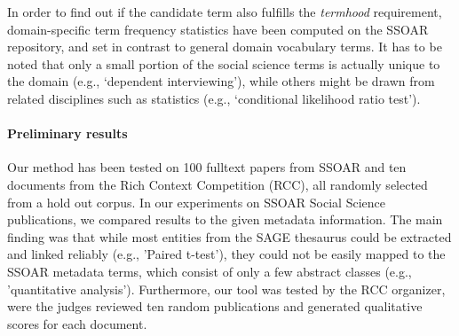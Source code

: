 In order to find out if the candidate term also fulfills the \textit{termhood} requirement, domain-specific term frequency statistics have been computed on the SSOAR repository, and set in contrast to general domain vocabulary terms. 
It has to be noted that only a small portion of the social science terms is actually unique to the domain (e.g., `dependent interviewing'), while others might be drawn from related disciplines such as statistics (e.g., `conditional likelihood ratio test').


\paragraph{Preliminary results}%
Our method has been tested on 100 fulltext papers from SSOAR and ten documents from the Rich Context Competition (RCC), all randomly selected from a hold out corpus.
In our experiments on SSOAR Social Science publications, we compared results to the given metadata information.
The main finding was that while most entities from the SAGE thesaurus could be extracted and linked reliably (e.g., 'Paired t-test'), they could not be easily mapped to the SSOAR metadata terms, which consist of only a few abstract classes (e.g., 'quantitative analysis'). Furthermore, our tool was tested by the RCC organizer, were the judges reviewed ten random publications and generated qualitative scores for each document. %

